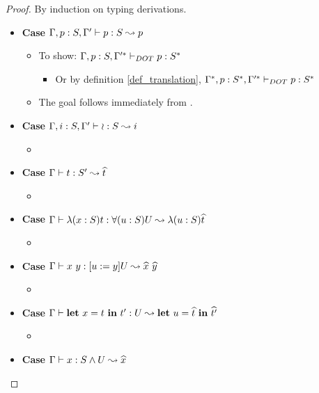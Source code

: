 \begin{proof}
    By induction on typing derivations.
    \begin{itemize}
        \item \textbf{Case} $\Gamma, p: S, \Gamma' \vdash p: S \leadsto p$
        \begin{itemize}
            \item To show: $\Gamma, p: S, \Gamma'^{*} \vdash_{DOT} p: S^{*}$
            \begin{itemize}
                \item Or by definition \ref{def_translation}, 
                    $\Gamma^{*}, p: S^{*},
                    \Gamma'^{*} \vdash_{DOT} p: S^{*}$
            \end{itemize}
            \item The goal follows immediately from .
        \end{itemize}
        \item \textbf{Case} $\Gamma, i: S, \Gamma' \vdash \wr: S \leadsto i$
        \begin{itemize}
            \item \TODOTHIS
        \end{itemize}
        \item \textbf{Case} $\Gamma \vdash t: S' \leadsto \widehat{t}$
        \begin{itemize}
            \item \TODOTHIS
        \end{itemize}
        \item \textbf{Case}
            $\Gamma \vdash \lambda(x:S)t: \forall(u:S)U \leadsto \lambda(u:S)\widehat{t}$
        \begin{itemize}
            \item \TODOTHIS
        \end{itemize}
        \item \textbf{Case} $\TJ{\Gamma}{x\ y}{\SUB{u}{y}U}{\HAT{x}\ \HAT{y}}$
        \begin{itemize}
            \item \TODOTHIS
        \end{itemize}
        \item \textbf{Case}
            $\Gamma \vdash \textbf{let}\ x = t\ \textbf{in}\ t': U \leadsto \textbf{let}\ u = \widehat{t}\ \textbf{in}\ \widehat{t'}$
        \begin{itemize}
            \item \TODOTHIS
        \end{itemize}
        \item \textbf{Case} $\Gamma \vdash x: S \wedge U \leadsto \widehat{x}$

\end{itemize}
\end{proof}
